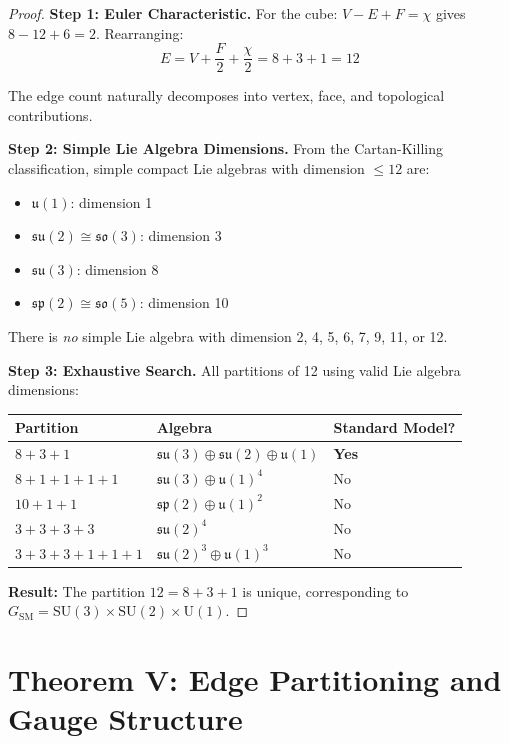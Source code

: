\documentclass[11pt,a4paper]{article}
\theoremstyle{plain}
\theoremstyle{definition}
\theoremstyle{remark}
\newcommand{\SUthree}{\text{SU}(3)}
\newcommand{\SUtwo}{\text{SU}(2)}
\newcommand{\Uone}{\text{U}(1)}
\newcommand{\GSM}{G_{\text{SM}}}
\begin{document}
\begin{proof}
\textbf{Step 1: Euler Characteristic.} For the cube: $V - E + F = \chi$ gives $8 - 12 + 6 = 2$. Rearranging:
\[
E = V + \frac{F}{2} + \frac{\chi}{2} = 8 + 3 + 1 = 12
\]

The edge count naturally decomposes into vertex, face, and topological contributions.

\textbf{Step 2: Simple Lie Algebra Dimensions.} From the Cartan-Killing classification, simple compact Lie algebras with dimension $\leq 12$ are:
\begin{itemize}
  \item $\mathfrak{u}(1)$: dimension 1
  \item $\mathfrak{su}(2) \cong \mathfrak{so}(3)$: dimension 3
  \item $\mathfrak{su}(3)$: dimension 8
  \item $\mathfrak{sp}(2) \cong \mathfrak{so}(5)$: dimension 10
\end{itemize}

There is \emph{no} simple Lie algebra with dimension 2, 4, 5, 6, 7, 9, 11, or 12.

\textbf{Step 3: Exhaustive Search.} All partitions of 12 using valid Lie algebra dimensions:

\begin{center}
\begin{tabular}{lll}
\toprule
\textbf{Partition} & \textbf{Algebra} & \textbf{Standard Model?} \\
\midrule
$8 + 3 + 1$ & $\mathfrak{su}(3) \oplus \mathfrak{su}(2) \oplus \mathfrak{u}(1)$ & \textbf{Yes} \\
$8 + 1 + 1 + 1 + 1$ & $\mathfrak{su}(3) \oplus \mathfrak{u}(1)^4$ & No \\
$10 + 1 + 1$ & $\mathfrak{sp}(2) \oplus \mathfrak{u}(1)^2$ & No \\
$3 + 3 + 3 + 3$ & $\mathfrak{su}(2)^4$ & No \\
$3 + 3 + 3 + 1 + 1 + 1$ & $\mathfrak{su}(2)^3 \oplus \mathfrak{u}(1)^3$ & No \\
\bottomrule
\end{tabular}
\end{center}

\textbf{Result:} The partition $12 = 8 + 3 + 1$ is unique, corresponding to $\GSM = \SUthree \times \SUtwo \times \Uone$.
\end{proof}

\section{Theorem V: Edge Partitioning and Gauge Structure}
\end{document}
